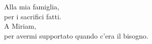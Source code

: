 \newpage\null\thispagestyle{empty}\newpage %
\thispagestyle{empty}
\newenvironment{dedication}
  {\clearpage           %
   \thispagestyle{empty}%
   \vspace*{\stretch{1}}%
   \itshape             %
   \raggedleft          %
  }
  {\par %
   \vspace{\stretch{3}} %
   \clearpage           %
  }

\begin{dedication}

Alla mia famiglia, \\per i sacrifici fatti.\\
A Miriam, \\per avermi supportato quando c'era il bisogno.

\end{dedication}